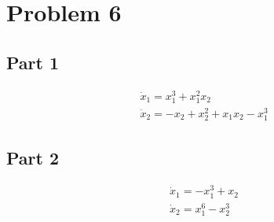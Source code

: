 \section{Problem 6}

\subsection*{Part 1}
$$
\begin{array}{l}
\dot{x}_{1}=x_{1}^{3}+x_{1}^{2} x_{2} \\
\dot{x}_{2}=-x_{2}+x_{2}^{2}+x_{1} x_{2}-x_{1}^{3}
\end{array}
$$

\subsection*{Part 2}


$$
\begin{array}{l}
\dot{x}_{1}=-x_{1}^{3}+x_{2} \\
\dot{x}_{2}=x_{1}^{6}-x_{2}^{3}
\end{array}
$$
